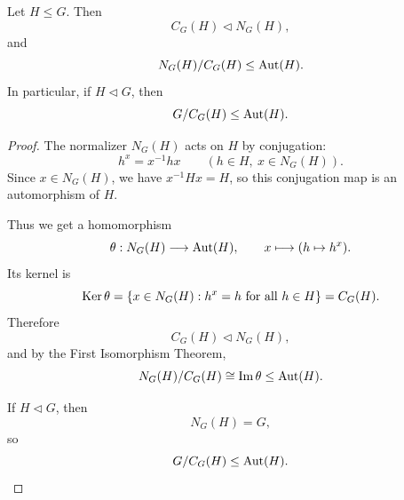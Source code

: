 \begin{lemma}[$N/C$-lemma]
Let $H\leq G$. Then
\[
    C_G(H)\lhd N_G(H),
\]
and
\[
    N_G(H)/C_G(H)\leq \operatorname{Aut}(H).
\]
In particular, if $H\lhd G$, then
\[
    G/C_G(H)\leq \operatorname{Aut}(H).
\]
\end{lemma}

\begin{proof}
The normalizer $N_G(H)$ acts on $H$ by conjugation:
\[
    h^x=x^{-1}hx
    \qquad
    (h\in H,\ x\in N_G(H)).
\]
Since $x\in N_G(H)$, we have $x^{-1}Hx=H$, so this conjugation map is an automorphism of $H$.

Thus we get a homomorphism
\[
    \theta:N_G(H)\longrightarrow \operatorname{Aut}(H),
    \qquad
    x\longmapsto (h\mapsto h^x).
\]
Its kernel is
\[
    \operatorname{Ker}\theta
    =
    \{x\in N_G(H):h^x=h\text{ for all }h\in H\}
    =
    C_G(H).
\]
Therefore
\[
    C_G(H)\lhd N_G(H),
\]
and by the First Isomorphism Theorem,
\[
    N_G(H)/C_G(H)
    \cong
    \operatorname{Im}\theta
    \leq
    \operatorname{Aut}(H).
\]

If $H\lhd G$, then
\[
    N_G(H)=G,
\]
so
\[
    G/C_G(H)\leq \operatorname{Aut}(H).
\]
\end{proof}

